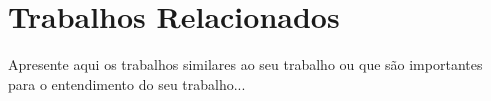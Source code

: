\chapter{Trabalhos Relacionados}
\label{cap:trabalhos:relacionados}

Apresente aqui os trabalhos similares ao seu trabalho ou que são importantes para o entendimento do seu trabalho...


